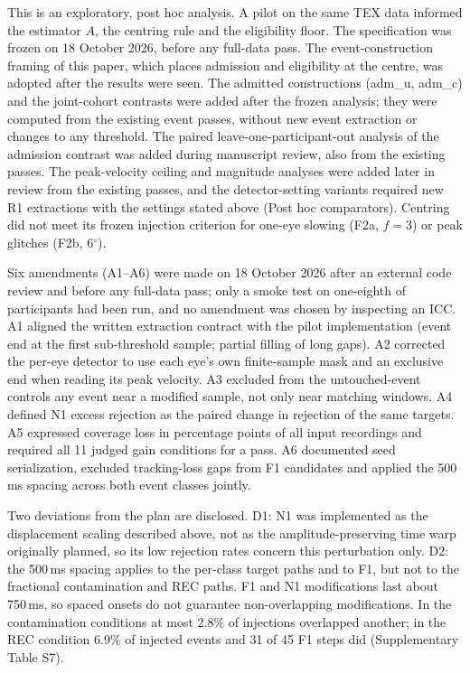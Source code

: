 This is an exploratory, post hoc analysis. A pilot on the same TEX data informed the estimator $A$, the centring rule and the eligibility floor. The specification was frozen on 18 October 2026, before any full-data pass. The event-construction framing of this paper, which places admission and eligibility at the centre, was adopted after the results were seen. The admitted constructions (adm\_u, adm\_c) and the joint-cohort contrasts were added after the frozen analysis; they were computed from the existing event passes, without new event extraction or changes to any threshold. The paired leave-one-participant-out analysis of the admission contrast was added during manuscript review, also from the existing passes. The peak-velocity ceiling and magnitude analyses were added later in review from the existing passes, and the detector-setting variants required new R1 extractions with the settings stated above (Post hoc comparators). Centring did not meet its frozen injection criterion for one-eye slowing (F2a, $f = 3$) or peak glitches (F2b, 6$^\circ$).

Six amendments (A1--A6) were made on 18 October 2026 after an external code review and before any full-data pass; only a smoke test on one-eighth of participants had been run, and no amendment was chosen by inspecting an ICC. A1 aligned the written extraction contract with the pilot implementation (event end at the first sub-threshold sample; partial filling of long gaps). A2 corrected the per-eye detector to use each eye's own finite-sample mask and an exclusive end when reading its peak velocity. A3 excluded from the untouched-event controls any event near a modified sample, not only near matching windows. A4 defined N1 excess rejection as the paired change in rejection of the same targets. A5 expressed coverage loss in percentage points of all input recordings and required all 11 judged gain conditions for a pass. A6 documented seed serialization, excluded tracking-loss gaps from F1 candidates and applied the 500\,ms spacing across both event classes jointly.

Two deviations from the plan are disclosed. D1: N1 was implemented as the displacement scaling described above, not as the amplitude-preserving time warp originally planned, so its low rejection rates concern this perturbation only. D2: the 500\,ms spacing applies to the per-class target paths and to F1, but not to the fractional contamination and REC paths. F1 and N1 modifications last about 750\,ms, so spaced onsets do not guarantee non-overlapping modifications. In the contamination conditions at most 2.8\% of injections overlapped another; in the REC condition 6.9\% of injected events and 31 of 45 F1 steps did (Supplementary Table S7).

